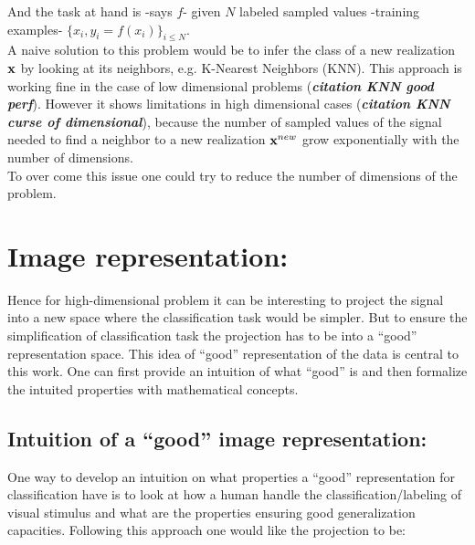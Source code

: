 \documentclass[a4paper,11pt]{report}
\begin{document}
		And the task at hand is  -says $f$- given $N$ labeled sampled values -training examples- $\{x_{i}, y_{i}=f(x_{i})\}_{i\leq N}$.\\
		
		A naive solution to this problem would be to infer the class of a new realization ${\bf x}$ by looking at its neighbors, e.g. K-Nearest Neighbors (KNN). This approach is working fine in the case of low dimensional problems (\textbf{\textit{citation KNN good perf}}). However it shows limitations in high dimensional cases (\textbf{\textit{citation KNN curse of dimensional}}), because the number of sampled values of the signal needed to find a neighbor to a new realization ${\bf x}^{new}$ grow exponentially with the number of dimensions.\\
			
		To over come this issue one could try to reduce the number of dimensions of the problem. 
		
		
		
	\section{Image representation:}
		\label{sec:Intro/Image rep}
		
		Hence for high-dimensional problem it can be interesting to project the signal into a new space where the classification task would be simpler. But to ensure the simplification of classification task the projection has to be into a ``good'' representation space. This idea of ``good'' representation of the data is central to this work. One can first provide an intuition of what ``good'' is and then formalize the intuited properties with mathematical concepts.
%     
		\subsection{Intuition of a ``good'' image representation:}
      \label{sec:Intro/Image rep/Intuition}
      
      One way to develop an intuition on what properties a ``good'' representation for classification have is to look at how a human handle the classification/labeling of visual stimulus and what are the properties ensuring good generalization capacities. Following this approach one would like the projection to be:
      
\end{document}
